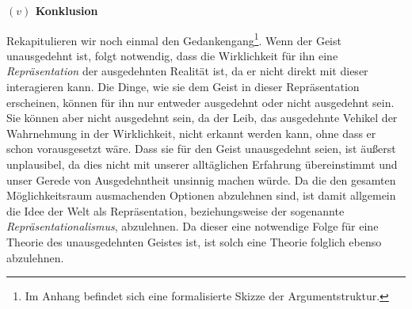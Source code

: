 \documentclass[a4paper, 12pt]{article}
\begin{document}
\begin{onehalfspace}




\vspace{5mm}
\noindent\textbf{$(v)$ Konklusion}

\noindent Rekapitulieren wir noch einmal den Gedankengang\footnote{Im Anhang befindet sich eine formalisierte Skizze der Argumentstruktur.}. Wenn der Geist unausgedehnt ist, folgt notwendig, dass die Wirklichkeit für ihn eine \emph{Repräsentation} der ausgedehnten Realität ist, da er nicht direkt mit dieser interagieren kann. Die Dinge, wie sie dem Geist in dieser Repräsentation erscheinen, können für ihn nur entweder ausgedehnt oder nicht ausgedehnt sein. Sie können aber nicht ausgedehnt sein, da der Leib, das ausgedehnte Vehikel der Wahrnehmung in der Wirklichkeit, nicht erkannt werden kann, ohne dass er schon vorausgesetzt wäre. Dass sie für den Geist unausgedehnt seien, ist äußerst unplausibel, da dies nicht mit unserer alltäglichen Erfahrung übereinstimmt und unser Gerede von Ausgedehntheit unsinnig machen würde. Da die den gesamten Möglichkeitsraum ausmachenden Optionen abzulehnen sind, ist damit allgemein die Idee der Welt als Repräsentation, beziehungsweise der sogenannte \emph{Repräsentationalismus}, abzulehnen. Da dieser eine notwendige Folge für eine Theorie des unausgedehnten Geistes ist, ist solch eine Theorie folglich ebenso abzulehnen.


\end{onehalfspace}
\end{document}
